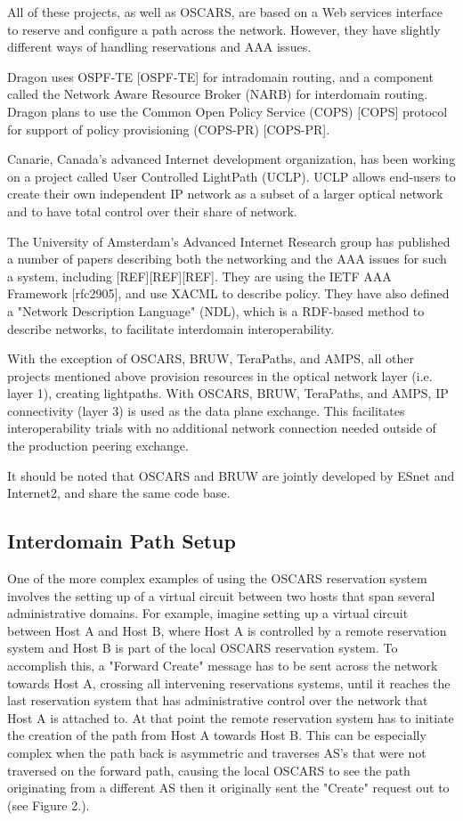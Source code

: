 \documentclass[conference]{IEEEtran}
\begin{document}
All of these projects, as well as OSCARS, are based on a Web services 
interface to reserve and configure a path across the network. However, they 
have slightly different ways of handling reservations and AAA issues.

Dragon uses OSPF-TE [OSPF-TE] for intradomain routing, and a component called
the Network Aware Resource Broker (NARB) for interdomain routing.
Dragon plans to use the Common Open Policy Service (COPS) [COPS]
protocol for support of policy provisioning (COPS-PR) [COPS-PR].

Canarie, Canada's advanced Internet development organization, has been
working on a project called User Controlled LightPath (UCLP).  UCLP
allows end-users to create their own independent IP network as a subset
of a larger optical network and to have total control over their share
of network.

The University of Amsterdam's Advanced Internet Research group has
published a number of papers
describing both the networking and the AAA issues for such a system,
including [REF][REF][REF]. They are using the IETF AAA Framework
[rfc2905], and use XACML to describe policy. They have also defined a
"Network Description Language" (NDL), which is a RDF-based method to
describe networks, to facilitate interdomain interoperability.

With the exception of OSCARS, BRUW,
TeraPaths, and AMPS, all other projects mentioned above provision resources
in the optical network layer (i.e. layer 1), creating lightpaths.
With OSCARS, BRUW, TeraPaths, and AMPS, IP connectivity (layer
3) is used as the data plane exchange.  This facilitates interoperability
trials with no additional network connection needed outside of the production
peering exchange.

It should be noted that OSCARS and BRUW are jointly developed by ESnet and Internet2, and share the same code base.

\subsection{Interdomain Path Setup }
One of the more complex examples of using the OSCARS reservation system involves
the setting up of a virtual circuit between two hosts that span several administrative domains.
For example, imagine setting up a
virtual circuit between Host A and Host B, where Host A is controlled by a remote reservation
system and Host B is part of the local OSCARS reservation system.  To accomplish
this, a "Forward Create" message has to be sent across the network towards Host
A, crossing all intervening reservations systems, until it reaches the last
reservation system that has administrative control over the network that Host A is attached to.
At that point the remote reservation system has to initiate the creation of the
path from Host A towards Host B.  This can be especially complex when the path
back is asymmetric and traverses AS's that were not traversed on the forward
path, causing the local OSCARS to see the path originating from a different 
AS then it originally sent the "Create" request out to (see Figure 2.).
\end{document}
